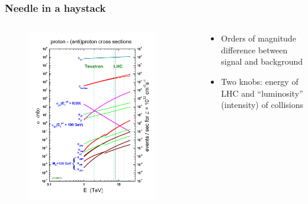 \begin{frame}
\frametitle{Needle in a haystack}

\begin{columns}[T] %

\begin{column}{.50\textwidth}
\begin{figure}[htbp]
\begin{center}
\includegraphics[width=0.9\textwidth]{images/crosssections2013.jpeg}
\end{center}
\end{figure}
\end{column}%

\begin{column}{.50\textwidth}
\begin{itemize}
\item Orders of magnitude difference between signal and background
\item Two knobs: energy of LHC and ``luminosity'' (intensity) of collisions
\end{itemize}
\end{column}%




\end{columns}


\end{frame}


